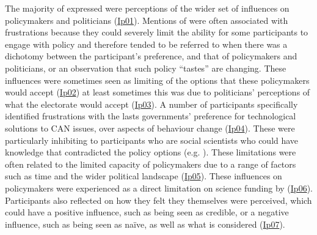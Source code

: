 The majority of \skipers{} expressed were perceptions of the wider set of influences on policymakers and politicians (\hyperref[tab:resskipers]{Ip01}). Mentions of \skipers{} were often associated with frustrations because they could severely limit the ability for some participants to engage with policy and therefore  tended to be referred to when there was a dichotomy between the participant's preference, and that of policymakers and politicians, or an observation that such policy ``tastes'' are changing. These influences were sometimes seen as limiting of the options that these policymakers would accept (\hyperref[tab:resskipers]{Ip02}) at least sometimes this was due to politicians' perceptions of what the electorate would accept (\hyperref[tab:resskipers]{Ip03}). A number of participants specifically identified frustrations with the lasts governments' preference for technological solutions to CAN issues, over aspects of behaviour change (\hyperref[tab:resskipers]{Ip04}). These were particularly inhibiting to participants who are social scientists who could have knowledge that contradicted the policy options (e.g. ). These limitations were often related to the limited capacity of policymakers due to a range of factors such as time and the wider political landscape (\hyperref[tab:resskipers]{Ip05}). These influences on policymakers were experienced as a direct limitation on science funding by  (\hyperref[tab:resskipers]{Ip06}). Participants also reflected on how they felt they themselves were perceived, which could have a positive influence, such as being seen as credible, or a negative influence, such as being seen as na\"ive, as well as what is considered  (\hyperref[tab:resskipers]{Ip07}).

